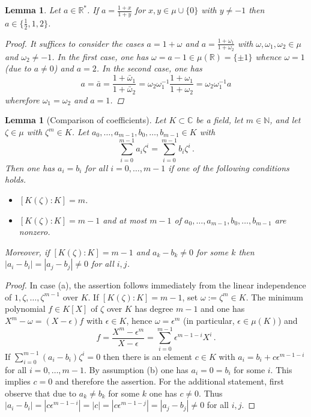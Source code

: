 \documentclass[a4paper]{amsart}
\newtheorem{lem}[theorem]{Lemma}
\theoremstyle{definition}
\numberwithin{equation}{section}
\numberwithin{theorem}{section}
\begin{document}
\begin{lem}\label{l1}
Let $a\in{\mathbb{R}}^*$. If $a=\tfrac{1+x}{1+y}$ for $x,y\in\mu\cup\{0\}$ with
$y\neq -1$ then
$a\in\{\tfrac{1}{2},1,2\}$.
\begin{proof}
It suffices to consider the cases $a=1+\omega$ and
$a=\tfrac{1+\omega_1}{1+\omega_2}$ with
$\omega,\omega_1,\omega_2\in\mu$ and $\omega_2\neq -1$. In the
first case, one has $\omega=a-1\in\mu({\mathbb{R}})=\{\pm 1\}$ whence $\omega=1$ (due
to $a\neq 0$) and $a=2$. In the second case, one has
$$
a=\bar{a}=\frac{1+\bar{\omega}_1}{1+\bar{\omega}_2}=\omega_2\omega_1^{-1}\frac{1+\omega_1}{1+\omega_2}=\omega_2\omega_1^{-1}a
$$ 
wherefore $\omega_1=\omega_2$ and $a=1$.
\end{proof}
\end{lem}

\begin{lem}[Comparison of coefficients]\label{l2}
Let $K\subset{\mathbb{C}}$ be a field, let $m\in{\mathbb{N}}$, and let $\zeta\in\mu$ with
$\zeta^m\in K$. Let
$a_0,\dots,a_{m-1},b_0,\dots,b_{m-1}\in K$ with
$$
\sum_{i=0}^{m-1}a_i\zeta^i=\sum_{i=0}^{m-1}b_i\zeta^i\,.
$$
Then one has $a_i=b_i$ for all $i=0,\dots,m-1$ if one of the following
conditions holds.
\begin{itemize}
\item[(a)]
$[K(\zeta) :K]=m$.
\item[(b)]
$[K(\zeta) :K]=m-1$ and at most $m-1$ of $a_0,\dots,a_{m-1},b_0,\dots,b_{m-1}$ are nonzero.
\end{itemize}
Moreover, if $[K(\zeta) :K]=m-1$ and $a_k-b_k\neq 0$ for some $k$ then
$|a_i-b_i|=|a_j-b_j|\neq 0$ for all $i,j$. 
\end{lem}
\begin{proof}
In case (a), the assertion follows immediately from the linear independence
of $1,\zeta,\dots,\zeta^{m-1}$ over $K$. If $[K(\zeta) :K]=m-1$, set $\omega:=\zeta^m\in K$. The minimum
polynomial $f\in K[X]$ of $\zeta$ over $K$ has degree $m-1$ and one
has $X^{m}-\omega=(X-\epsilon)f$ with $\epsilon\in K$, hence
$\omega=\epsilon^m$ (in particular, $\epsilon \in\mu(K)$) and
$$
f=\frac{X^m-\epsilon^m}{X-\epsilon}=\sum_{i=0}^{m-1}\epsilon^{m-1-i}X^i\,.
$$
If $\sum_{i=0}^{m-1}(a_i-b_i)\zeta^i=0$ then there is an element $c\in K$ with
$a_i=b_i+c\epsilon^{m-1-i}$ for all $i=0,\dots,m-1$. By assumption
(b) one has $a_i=0=b_i$ for some $i$. This implies $c=0$ and therefore
the assertion. For the additional statement, first observe that due to
$a_k\neq b_k$ for some $k$ one has $c\neq 0$. Thus 
$|a_i-b_i|=|c\epsilon^{m-1-i}|=|c|=|c\epsilon^{m-1-j}|=|a_j-b_j|\neq
0$ for all $i,j$.
\end{proof}
\end{document}
